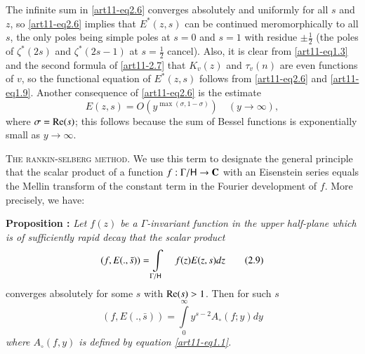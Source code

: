The infinite sum in \eqref{art11-eq2.6} converges absolutely and uniformly for all $s$ and $z$, so \eqref{art11-eq2.6} implies that $E^\ast(z,s)$ can be continued meromorphically to all $s$, the only poles being simple poles at $s=0$ and $s =1$ with residue $\pm \frac{1}{2}$ (the poles of $\zeta^\ast (2s)$ and $\zeta^\ast (2s-1)$ at $s = \frac{1}{2}$ cancel). Also, it is clear from \eqref{art11-eq1.3} and the second formula of \eqref{art11-2.7} that $K_v (z)$ and $\tau_v (n)$ are even functions of $v$, so the functional equation of $E^\ast(z,s)$ follows from \eqref{art11-eq2.6} and \eqref{art11-eq1.9}. Another consequence of \eqref{art11-eq2.6} is the estimate 
\begin{equation*}
E(z,s) = O(y^{\max (\sigma, 1 -\sigma)})\quad (y \to \infty), \tag{2.8}\label{art11-eq2.8}
\end{equation*}
where $\sigma = \operatorname{Re}(s)$; this follows because the sum of Bessel functions is exponentially small as $y \to \infty$. 

\medskip
\noindent
\textsc{The rankin-selberg method.} We use this term to designate the general principle that the scalar product of a function $f: \Gamma / \mathsf{H} \to \mathbf{C}$ with an Eisenstein series equals the Mellin transform of the constant term in the Fourier development of $f$. More precisely, we have:

\medskip
\noindent
{\bfseries Proposition :\label{art11-prop1}}
\textit{Let $f(z)$ be a $\Gamma$-invariant function in the upper half-plane which is of sufficiently rapid decay that the scalar product}
\begin{equation*}
(f, E(.,\bar{s})) = \int\limits_{\Gamma / \mathsf{H}} \quad f(z) E (z,s) dz \tag{2.9}\label{art11-eq2.9}
\end{equation*}
converges absolutely for some $s$ with $\operatorname{Re} (s) >1$. Then for such $s$
\begin{equation*}
(f, E (.,\bar{s})) = \int\limits^\infty_{0} y^{s-2} A_\circ (f;y) dy \tag{2.10}\label{art11-eq2.10}
\end{equation*}
\textit{where $A_\circ (f,y)$ is defined by equation \eqref{art11-eq1.1}.}

